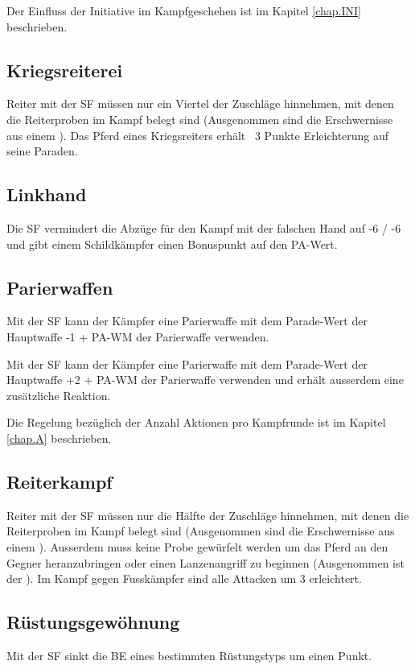 Der Einfluss der Initiative im Kampfgeschehen ist im Kapitel \ref{chap.INI}
beschrieben.

\subsection{Kriegsreiterei}
Reiter mit der SF  müssen nur ein Viertel der
Zuschläge hinnehmen, mit denen die Reiterproben im Kampf belegt sind
(Ausgenommen sind die Erschwernisse aus einem ). Das Pferd eines Kriegsreiters erhält \ 3 Punkte Erleichterung
auf seine Paraden.

\subsection{Linkhand}
Die SF  vermindert die Abzüge für den Kampf mit der
falschen Hand auf -6 / -6 und gibt einem Schildkämpfer einen Bonuspunkt auf den
PA-Wert.

\subsection{Parierwaffen}
Mit der SF  kann der Kämpfer eine Parierwaffe mit
dem Parade-Wert der Hauptwaffe -1 + PA-WM der Parierwaffe verwenden.

Mit der SF  kann der Kämpfer eine Parierwaffe mit
dem Parade-Wert der Hauptwaffe +2 + PA-WM der Parierwaffe verwenden und erhält
ausserdem eine zusätzliche Reaktion.

Die Regelung bezüglich der Anzahl Aktionen pro Kampfrunde ist im Kapitel
\ref{chap.A} beschrieben.

\subsection{Reiterkampf}
Reiter mit der SF  müssen nur die Hälfte der Zuschläge
hinnehmen, mit denen die Reiterproben im Kampf belegt sind (Ausgenommen sind
die Erschwernisse aus einem ). Ausserdem
muss keine Probe gewürfelt werden um das Pferd an den Gegner heranzubringen
oder einen Lanzenangriff zu beginnen (Ausgenommen ist der
). Im Kampf gegen Fusskämpfer sind alle
Attacken um 3 erleichtert.

\subsection{Rüstungsgewöhnung}
Mit der SF  sinkt die BE eines bestimmten
Rüstungstyps um einen Punkt.

